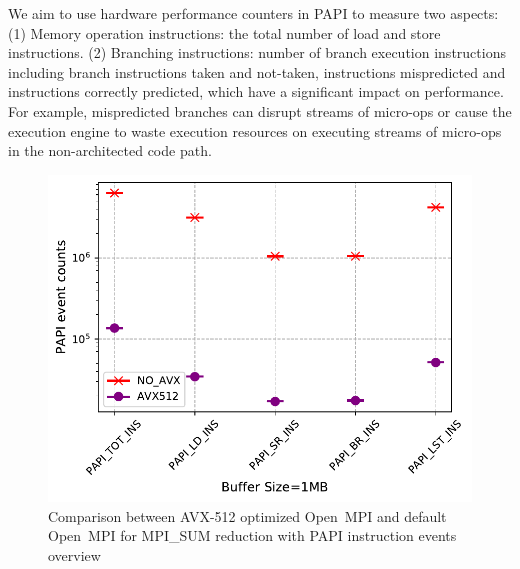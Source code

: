 \documentclass[5p,times,twocolumn]{elsarticle}
\newcommand{\ompi}[0]{Open~MPI\xspace}
\begin{document}

We aim to use hardware performance counters in PAPI to measure two aspects:
(1) Memory operation instructions: the total number of load and store instructions.
(2) Branching instructions: number of branch execution instructions including branch instructions taken and not-taken,
instructions mispredicted and instructions correctly predicted, which have a significant impact on performance.
For example, mispredicted branches can disrupt streams of micro-ops or cause
the execution engine to waste execution resources on executing
streams of micro-ops in the non-architected code path.

\begin{figure}[h]
    \centering
    \includegraphics[width=\linewidth]{papi_ins_review.pdf}
    \caption{Comparison between AVX-512 optimized \ompi and default \ompi for MPI\_SUM reduction with PAPI instruction events overview}
    \label{fig:papiins}%
\end{figure}
\end{document}
